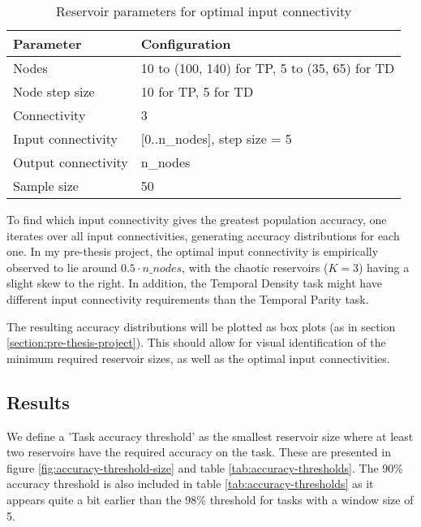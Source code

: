 \begin{table}[ht]
    \centering
    \caption{Reservoir parameters for optimal input connectivity}
    \label{tab:ic-reservoir-parameters}
    \begin{tabular}{ll}
        \hline
        \textbf{Parameter} & \textbf{Configuration} \\
        \hline
        \hline
        Nodes               & 10 to (100, 140) for TP, 5 to (35, 65) for TD \\
        Node step size      & 10 for TP, 5 for TD \\
        Connectivity        & 3                              \\
        Input connectivity  & [0..n\_nodes], step size = 5   \\
        Output connectivity & n\_nodes                       \\
        Sample size         & 50 \\
        \hline
    \end{tabular}
\end{table}

To find which input connectivity gives the greatest population accuracy,
one iterates over all input connectivities, generating accuracy distributions for each one.
In my pre-thesis project,
the optimal input connectivity is empirically observed to lie around $ 0.5 \cdot n\_nodes $,
with the chaotic reservoirs ($K=3$) having a slight skew to the right.
In addition,
the Temporal Density task might have different input connectivity requirements than the Temporal Parity task.

The resulting accuracy distributions will be plotted as box plots (as in section \ref{section:pre-thesis-project}).
This should allow for visual identification of the minimum required reservoir sizes,
as well as the optimal input connectivities.

\subsection{Results}
\label{subsection:reservoir_size-input_connectivity:results}

We define a 'Task accuracy threshold' as the smallest reservoir size where at least two reservoirs have the required accuracy on the task.
These are presented in figure \ref{fig:accuracy-threshold-size} and table \ref{tab:accuracy-thresholds}.
The 90\% accuracy threshold is also included in table \ref{tab:accuracy-thresholds} as it appears quite a bit earlier than the 98\% threshold for tasks with a window size of 5.

